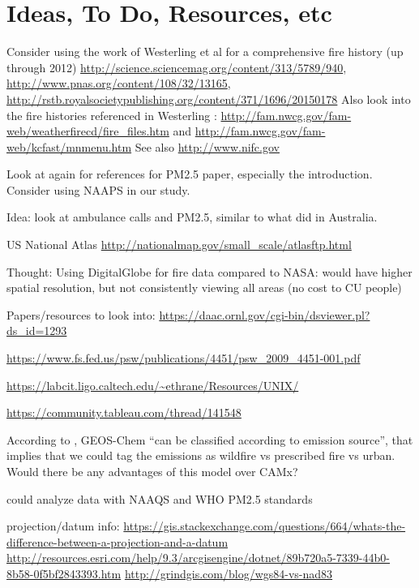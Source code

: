 \section{Ideas, To Do, Resources, etc}

Consider using the work of Westerling et al for a comprehensive fire history (up through 2012) \url{http://science.sciencemag.org/content/313/5789/940}, \url{http://www.pnas.org/content/108/32/13165}, \url{http://rstb.royalsocietypublishing.org/content/371/1696/20150178} \cite{westerling_increasing_2016,WesterlingCorrection2016} Also look into the fire histories referenced in Westerling \cite{westerling_increasing_2016,WesterlingCorrection2016}: \url{http://fam.nwcg.gov/fam-web/weatherfirecd/fire_files.htm} and \url{http://fam.nwcg.gov/fam-web/kcfast/mnmenu.htm} See also \url{http://www.nifc.gov}

Look at \cite{kollanus_effects_2016} again for references for PM2.5 paper, especially the introduction. Consider using NAAPS in our study. 

Idea: look at ambulance calls and PM2.5, similar to what \cite{salimi_ambient_2016} did in Australia.

US National Atlas \url{http://nationalmap.gov/small_scale/atlasftp.html}

Thought: Using DigitalGlobe for fire data compared to NASA: would have higher spatial resolution, but not consistently viewing all areas (no cost to CU people) 


Papers/resources to look into: \url{https://daac.ornl.gov/cgi-bin/dsviewer.pl?ds_id=1293}

\url{https://www.fs.fed.us/psw/publications/4451/psw_2009_4451-001.pdf}

\url{https://labcit.ligo.caltech.edu/~ethrane/Resources/UNIX/}

\url{https://community.tableau.com/thread/141548}

According to \cite{liu_particulate_2016}, GEOS-Chem ``can be classified according to emission source'', that implies that we could tag the emissions as wildfire vs prescribed fire vs urban. Would there be any advantages of this model over CAMx?

could analyze data with NAAQS and WHO PM2.5 standards

projection/datum info: \url{https://gis.stackexchange.com/questions/664/whats-the-difference-between-a-projection-and-a-datum}
\url{http://resources.esri.com/help/9.3/arcgisengine/dotnet/89b720a5-7339-44b0-8b58-0f5bf2843393.htm}
\url{http://grindgis.com/blog/wgs84-vs-nad83}


